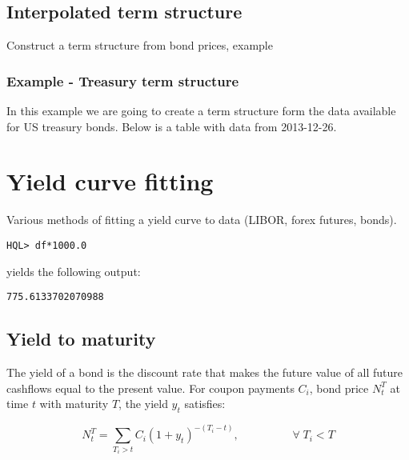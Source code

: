 \documentclass[11pt,a4paper]{article}
\numberwithin{equation}{section}
\begin{document}
\subsection{Interpolated term structure}
Construct a term structure from bond prices, example

\subsubsection{Example - Treasury term structure}
In this example we are going to create a term structure form the data available for
US treasury bonds. Below is a table with data from 2013-12-26.


\section{Yield curve fitting}
Various methods of fitting a yield curve to data (LIBOR, forex futures, bonds).

\begin{lstlisting}
HQL> df*1000.0
\end{lstlisting}
yields the following output:
\FrameSep
\begin{lstlisting}[style=Output]
775.6133702070988
\end{lstlisting}

\subsection{Yield to maturity}

The yield of a bond is the discount rate that makes the future value of all future
cashflows equal to the present value. For coupon payments $C_i$, bond price $N_t^T$
at time $t$ with maturity $T$, the yield $y_t$ satisfies: 

\[
N_t^T = \sum_{T_i > t} C_i (1+y_t)^{-(T_i - t)}, \hspace{2cm} \forall\; T_i < T
\]
\end{document}
